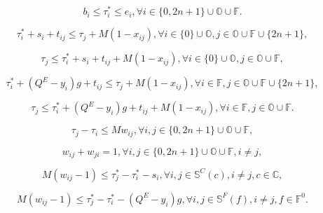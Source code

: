 \documentclass[10pt]{article}
\begin{document}
\begin{equation}
    \label{eq:19}
    b_i \le \tau_i^* \le e_i, \forall i \in \{0, 2n + 1\} \cup \mathbb{O} \cup \mathbb{F}. \tag{19}
\end{equation}

\begin{equation}
    \label{eq:20}
    \tau_i^* + s_i + t_{ij} \le \tau_j + M(1 - x_{ij}), \forall i \in \{0\} \cup \mathbb{O}, j \in \mathbb{O} \cup \mathbb{F} \cup \{2n + 1\}, \tag{20}
\end{equation}

\begin{equation}
    \label{eq:21}
    \tau_j \le \tau_i^* + s_i + t_{ij} + M(1 - x_{ij}), \forall i \in \{0\} \cup \mathbb{O}, j \in \mathbb{O} \cup \mathbb{F}, \tag{21}
\end{equation}

\begin{equation}
    \label{eq:22}
    \tau_i^* + (Q^E - y_i)g + t_{ij} \le \tau_j + M(1 - x_{ij}), \forall i \in \mathbb{F}, j \in \mathbb{O} \cup \mathbb{F} \cup \{2n + 1\}, \tag{22}
\end{equation}

\begin{equation}
    \label{eq:23}
    \tau_j \le \tau_i^* + (Q^E - y_i)g + t_{ij} + M(1 - x_{ij}), \forall i \in \mathbb{F}, j \in \mathbb{O} \cup \mathbb{F}. \tag{23}
\end{equation}

\begin{equation}
    \label{eq:24}
    \tau_j - \tau_i \le M w_{ij}, \forall i, j \in \{0, 2n + 1\} \cup \mathbb{O} \cup \mathbb{F}, \tag{24}
\end{equation}

\begin{equation}
    \label{eq:25}
    w_{ij} + w_{ji} = 1, \forall i, j \in \{0, 2n + 1\} \cup \mathbb{O} \cup \mathbb{F}, i \neq j, \tag{25}
\end{equation}

\begin{equation}
    \label{eq:26}
    M(w_{ij} - 1) \le \tau_j^* - \tau_i^* - s_i, \forall i, j \in \mathbb{S}^C(c), i \neq j, c \in \mathbb{C}, \tag{26}
\end{equation}

\begin{equation}
    \label{eq:27}
    M(w_{ij} - 1) \le \tau_j^* - \tau_i^* - (Q^E - y_i)g, \forall i, j \in \mathbb{S}^F(f), i \neq j, f \in \mathbb{F}^0. \tag{27}
\end{equation}
\end{document}
